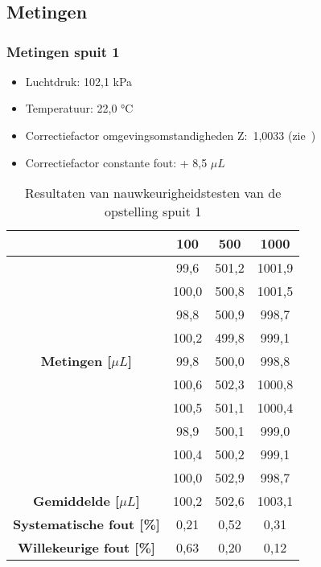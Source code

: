 \chapter{}
\section{Metingen}
\subsection*{Metingen spuit 1}
\begin{itemize}
    \item Luchtdruk: 102,1 kPa
    \item Temperatuur: 22,0 °C
    \item Correctiefactor omgevingsomstandigheden Z:\ 1,0033 (zie\ \cite{RN50})
    \item Correctiefactor constante fout: + 8,5 $\mu L$
\end{itemize}
\begin{table}[H] 
    \centering 
    \caption{Resultaten van nauwkeurigheidstesten van de opstelling spuit 1}
    \begin{tabular}{|c|c|c|c|}
        \hline
        \textbf{\rule{0pt}{3ex} Gewenste Volume [$\mu L$]} & 100 & 500 & 1000 \\
        \hline
        &99,6  & 501,2 & 1001,9\\
        &100,0 & 500,8 & 1001,5\\
        &98,8  & 500,9 & 998,7\\
        &100,2 & 499,8 & 999,1\\
        \textbf{Metingen [$\mu L$]}&99,8  & 500,0 & 998,8\\
        &100,6 & 502,3 & 1000,8\\
        &100,5 & 501,1 & 1000,4\\
        &98,9  & 500,1 & 999,0\\
        &100,4 & 500,2 & 999,1\\
        &100,0 & 502,9 & 998,7\\
        \hline
        \textbf{Gemiddelde [$\mu L$]} & 100,2 & 502,6 & 1003,1\\
        \textbf{Systematische fout [\%]} & 0,21 & 0,52 & 0,31\\
        \textbf{Willekeurige fout [\%]} & 0,63 & 0,20 & 0,12\\
        \hline
    \end{tabular}\label{tab:resultaten_spuit_1}
\end{table}

